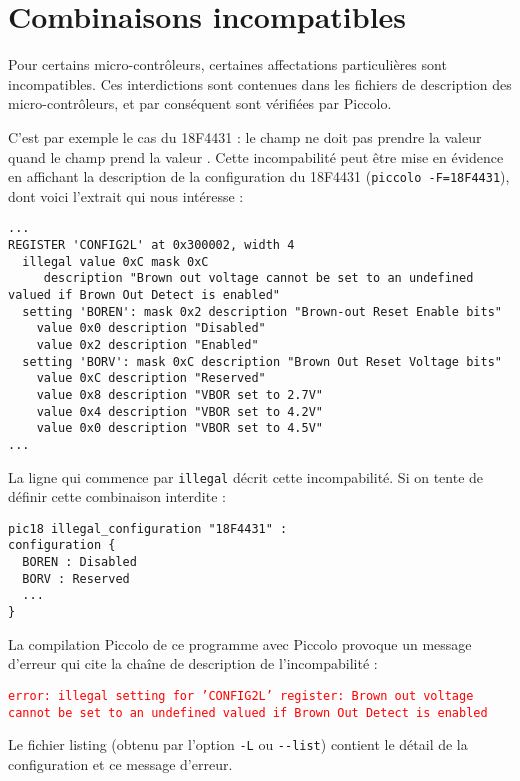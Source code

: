 \section{Combinaisons incompatibles}


Pour certains micro-contrôleurs, certaines affectations particulières sont incompatibles. Ces interdictions sont contenues dans les fichiers de description des micro-contrôleurs, et par conséquent sont vérifiées par Piccolo. 

C’est par exemple le cas du 18F4431 : le champ  ne doit pas prendre la valeur  quand le champ  prend la valeur . Cette incompabilité peut être mise en évidence en affichant la description de la configuration du 18F4431 (\texttt{piccolo -F=18F4431}), dont voici l'extrait qui nous intéresse :
{\small
\begin{lstlisting}[frame=l]
...
REGISTER 'CONFIG2L' at 0x300002, width 4
  illegal value 0xC mask 0xC
     description "Brown out voltage cannot be set to an undefined valued if Brown Out Detect is enabled"
  setting 'BOREN': mask 0x2 description "Brown-out Reset Enable bits"
    value 0x0 description "Disabled"
    value 0x2 description "Enabled"
  setting 'BORV': mask 0xC description "Brown Out Reset Voltage bits"
    value 0xC description "Reserved"
    value 0x8 description "VBOR set to 2.7V"
    value 0x4 description "VBOR set to 4.2V"
    value 0x0 description "VBOR set to 4.5V"
...
\end{lstlisting}
}


La ligne qui commence par \texttt{illegal} décrit cette incompabilité. Si on tente de définir cette combinaison interdite :
\begin{lstlisting}[language=piccolo]
pic18 illegal_configuration "18F4431" :
configuration {
  BOREN : Disabled
  BORV : Reserved
  ...
}
\end{lstlisting}

La compilation Piccolo de ce programme avec Piccolo provoque un message d’erreur qui cite la chaîne de description de l'incompabilité :


\textcolor{red}{\tt error: illegal setting for 'CONFIG2L' register: Brown out voltage cannot be set to an undefined valued if Brown Out Detect is enabled}

Le fichier listing (obtenu par l’option \texttt{-L} ou \texttt{-{}-list}) contient le détail de la configuration et ce message d’erreur.

